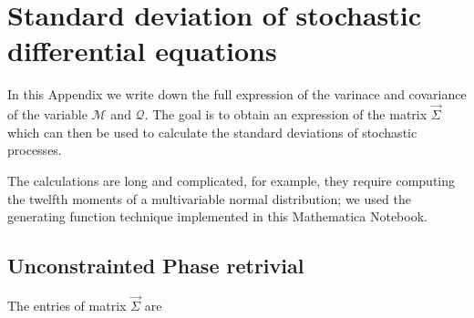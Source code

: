 \chapter[Standard deviation of SDEs]{Standard deviation of stochastic differential equations}
\label{app:std_sde}
In this Appendix we write down the full expression of the varinace and covariance of the variable \(\mathcal{M}\)
and \(\mathcal{Q}\). The goal is to obtain an expression of the matrix \(\vec{\Sigma}\) 
which can then be used to calculate the standard deviations of stochastic processes.

The calculations are long and complicated, for example, they require computing the twelfth moments of a multivariable normal distribution;
we used the generating function technique implemented in this Mathematica Notebook.
\section{Unconstrainted Phase retrivial}
The entries of matrix \(\vec{\Sigma}\) are 

